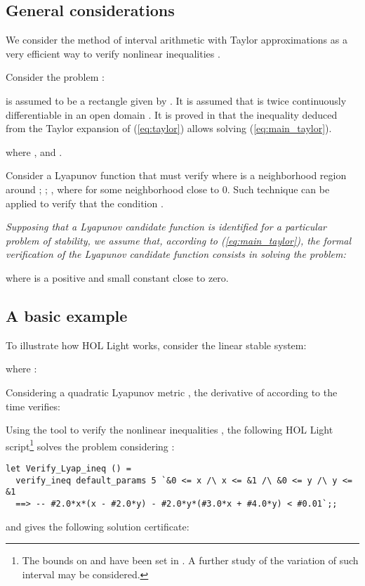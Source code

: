 \documentclass[12pt]{article}
\begin{document}
\subsection{General considerations}
We consider the method of interval arithmetic with Taylor approximations as a very efficient way to verify nonlinear inequalities \cite{solo}. 

Consider the problem :

\noindent
 is assumed to be a rectangle given by . It is assumed that  is twice continuously differentiable 
in an open domain . It is proved in \cite{solo} that the inequality deduced from the Taylor expansion of  (\ref{eq:taylor}) allows solving (\ref{eq:main_taylor}).




\noindent
where ,  and .

Consider a Lyapunov function \cite{Lyap}
 that must verify  where  is a neighborhood region around ; ; , where
 for some neighborhood close to 0. Such technique can be applied to verify that the condition .
{\it Supposing that a Lyapunov candidate function is identified for a particular problem of stability, we assume that, according to (\ref{eq:main_taylor}), the formal verification 
of the Lyapunov candidate function consists in solving the problem:



\noindent
where  is a positive and small constant close to zero.}

\subsection{A basic example}

To illustrate how HOL Light works, consider the linear stable system:


\noindent
where :

 
\noindent
Considering a quadratic Lyapunov metric , the derivative of  according to the time verifies:

Using the tool to verify the nonlinear inequalities \cite{solo}, the following HOL Light script\footnote{The bounds on  
and  have been set in . A further study of the variation of such interval may be considered.} solves the problem considering :

\begin{verbatim}
let Verify_Lyap_ineq () =
  verify_ineq default_params 5 `&0 <= x /\ x <= &1 /\ &0 <= y /\ y <= &1 
  ==> -- #2.0*x*(x - #2.0*y) - #2.0*y*(#3.0*x + #4.0*y) < #0.01`;;
\end{verbatim}
\noindent
and gives the following solution certificate:
\end{document}
